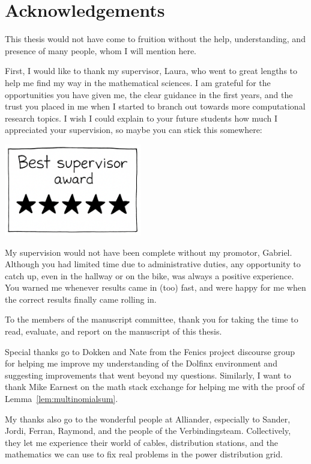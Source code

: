 \chapter*{Acknowledgements}



This thesis would not have come to fruition without the help, understanding, and presence of many people, whom I will mention here.

First, I would like to thank my supervisor, Laura, who went to great lengths to help me find my way in the mathematical sciences.
I am grateful for the opportunities you have given me, the clear guidance in the first years, and the trust you placed in me when I started to branch out towards more computational research topics.
I wish I could explain to your future students how much I appreciated your supervision, so maybe you can stick this somewhere:
\begin{center}
    \includegraphics[width=0.45\textwidth]{award}
\end{center}
My supervision would not have been complete without my promotor, Gabriel.
Although you had limited time due to administrative duties, any opportunity to catch up, even in the hallway or on the bike, was always a positive experience.
You warned me whenever results came in (too) fast, and were happy for me when the correct results finally came rolling in.

To the members of the manuscript committee, thank you for taking the time to read, evaluate, and report on the manuscript of this thesis.

Special thanks go to Dokken and Nate from the Fenics project discourse group for helping me improve my understanding of the Dolfinx environment and suggesting improvements that went beyond my questions.
Similarly, I want to thank Mike Earnest on the math stack exchange for helping me with the proof of Lemma~\ref{lem:multinomialsum}.

My thanks also go to the wonderful people at Alliander, especially to Sander, Jordi, Ferran, Raymond, and the people of the Verbindingsteam.
Collectively, they let me experience their world of cables, distribution stations, and the mathematics we can use to fix real problems in the power distribution grid.

